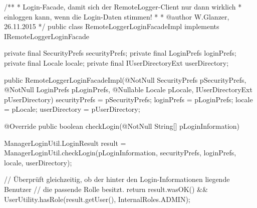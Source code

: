 \begin{spacing}{0.75}
	\begin{javacode}
/**
 * Login-Facade, damit sich der RemoteLogger-Client nur dann wirklich
 * einloggen kann, wenn die Login-Daten stimmen!
 *
 * @author W.Glanzer, 26.11.2015
 */
public class RemoteLoggerLoginFacadeImpl implements IRemoteLoggerLoginFacade
{
  private final SecurityPrefs securityPrefs;
  private final LoginPrefs loginPrefs;
  private final Locale locale;
  private final IUserDirectoryExt userDirectory;

  public RemoteLoggerLoginFacadeImpl(@NotNull SecurityPrefs pSecurityPrefs, 
                                     @NotNull LoginPrefs pLoginPrefs,
                                     @Nullable Locale pLocale, 
                                     IUserDirectoryExt pUserDirectory)
  {
    securityPrefs = pSecurityPrefs;
    loginPrefs = pLoginPrefs;
    locale = pLocale;
    userDirectory = pUserDirectory;
  }

  @Override
  public boolean checkLogin(@NotNull String[] pLoginInformation)
  {
    ManagerLoginUtil.LoginResult result = ManagerLoginUtil.checkLogin(pLoginInformation, 
                                          securityPrefs, loginPrefs, locale, userDirectory);
  
    // Überprüft gleichzeitig, ob der hinter den Login-Informationen liegende Benutzer
    // die passende Rolle besitzt.
    return result.wasOK() && UserUtility.hasRole(result.getUser(), InternalRoles.ADMIN);
  }
}  \end{javacode}
\end{spacing}